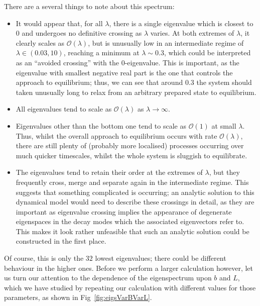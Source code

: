 There are a several things to note about this spectrum:
\begin{itemize}
 \item It would appear that, for all $\lambda$, there is a single eigenvalue which
 is closest to $0$ and undergoes no definitive crossing as $\lambda$ varies. At both extremes of
 $\lambda$, it clearly scales as $\mathcal{O}(\lambda)$, but is unusually low in an intermediate regime of $\lambda \in (0.03, 10)$, reaching a minimum at $\lambda \sim 0.3$, which could be
 interpreted as an ``avoided crossing'' with the 0-eigenvalue. This is
 important, as the eigenvalue with smallest negative real part is the one that controls
 the approach to equilibrium; thus, we can see that around $0.3$ the system should taken unusually long to relax from an arbitrary prepared state to equilibrium.
 \item All eigenvalues tend to scale as $\mathcal{O}(\lambda)$ as $\lambda \rightarrow \infty$.
 \item Eigenvalues other than the bottom one tend to scale as $\mathcal{O}(1)$ at small
 $\lambda$. Thus, whilst the overall approach to equilibrium occurs with rate 
 $\mathcal{O}(\lambda)$, there are still plenty of (probably more localised) processes 
 occurring over much quicker timescales, whilst the whole system is sluggish to 
 equilibrate.
 \item The eigenvalues tend to retain their order at the extremes of $\lambda$, 
 but they frequently cross, merge and separate again in the intermediate regime. This suggests that something complicated is occurring; an analytic solution to this dynamical model would need to describe these crossings in detail, as they are important as
 eigenvalue crossing implies the appearance of degenerate eigenspaces in the decay modes
 which the associated eigenvectors refer to. This makes it look rather 
 unfeasible that such an analytic solution could be constructed in the first place.
\end{itemize}
Of course, this is only the $32$ lowest eigenvalues; there could be different behaviour
in the higher ones. Before we perform a larger calculation however, let us turn our
attention to the dependence of the eigenspectrum upon $b$ and $L$, which we have studied
by repeating our calculation with different values for those parameters, as shown in
Fig~\ref{fig:eigsVarBVarL}.
